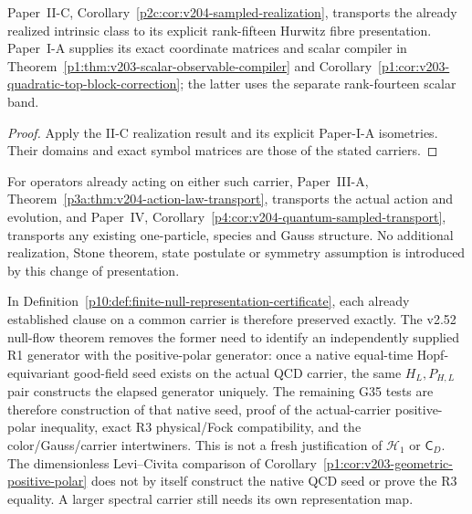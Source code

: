 \documentclass[12pt,a4paper]{article}
\begin{document}
\begin{corollary}
\label{p10:cor:v203-exact-geometric-sampling}
Paper~II-C, Corollary~\ref{p2c:cor:v204-sampled-realization}, transports
the already realized intrinsic class to its explicit rank-fifteen Hurwitz
fibre presentation. Paper~I-A supplies its exact coordinate matrices and
scalar compiler in Theorem~\ref{p1:thm:v203-scalar-observable-compiler}
and Corollary~\ref{p1:cor:v203-quadratic-top-block-correction}; the latter
uses the separate rank-fourteen scalar band.
\end{corollary}
\begin{proof}
Apply the II-C realization result and its explicit Paper-I-A isometries.
Their domains and exact symbol matrices are those of the stated carriers.
\end{proof}
For operators already acting on either such carrier, Paper~III-A,
Theorem~\ref{p3a:thm:v204-action-law-transport}, transports the actual
action and evolution, and Paper~IV,
Corollary~\ref{p4:cor:v204-quantum-sampled-transport}, transports any
existing one-particle, species and Gauss structure. No additional
realization, Stone theorem, state postulate or symmetry assumption is
introduced by this change of presentation.

In Definition~\ref{p10:def:finite-null-representation-certificate}, each
already established clause on a common carrier is therefore preserved
exactly.  The v2.52 null-flow theorem removes the former need to identify an
independently supplied R1 generator with the positive-polar generator: once a
native equal-time Hopf-equivariant good-field seed exists on the actual QCD
carrier, the same \(H_L,P_{H,L}\) pair constructs the elapsed generator
uniquely.  The remaining G35 tests are therefore construction of that native
seed, proof of the actual-carrier positive-polar inequality, exact R3
physical/Fock compatibility, and the color/Gauss/carrier intertwiners.  This
is not a fresh justification of $\mathcal H_1$ or $\mathsf C_D$.  The
dimensionless Levi--Civita comparison of
Corollary~\ref{p1:cor:v203-geometric-positive-polar} does not by itself
construct the native QCD seed or prove the R3 equality.  A larger spectral
carrier still needs its own representation map.
\end{document}
